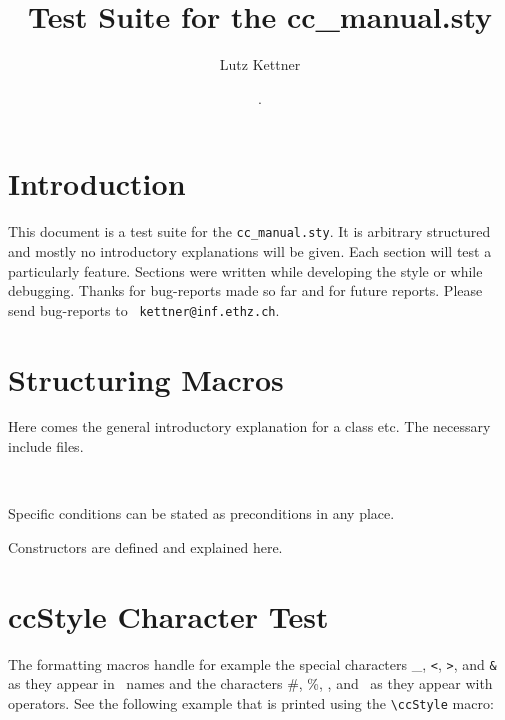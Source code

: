 \documentclass[12pt]{article}
\title {Test Suite for the cc\_manual.sty}
\author{Lutz Kettner}
\date{\ccRevision. \ccDate}
\begin{document}
\maketitle

\section{Introduction}

This document is a test suite for the {\tt cc\_manual.sty}. It is
arbitrary structured and mostly no introductory explanations will be given.
Each section will test a particularly feature. Sections were written
while developing the style or while debugging. Thanks for bug-reports
made so far and for future reports. Please send bug-reports to {\tt
  kettner@inf.ethz.ch}.


\section{Structuring Macros}

\ccDefinition Here comes the general introductory explanation for a
class etc. The necessary include files.

\\

\ccAccessFunctions

\ccPrecond Specific conditions can be stated as preconditions in any place.

\ccCreation Constructors are defined and explained here.

\section{ccStyle Character Test}

The formatting macros handle for example the special characters \_,
{\tt <}, {\tt >}, and {\tt \&} as they appear in \CC\ names and the
characters \#, \%, \ccHat, and \ccTilde\ as they appear with
operators. See the following example that is printed using the
{\verb+\cc+}{\tt Style} macro:
\end{document}
